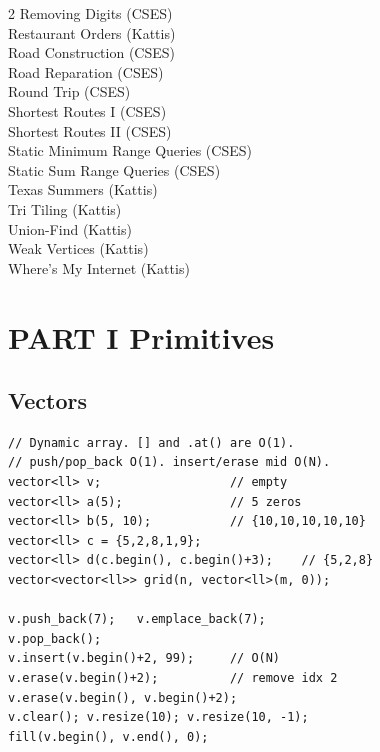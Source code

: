 \documentclass[10pt,letterpaper]{extarticle}
\newenvironment{block}[1]
  {\subsection*{#1}\nopagebreak}
  {\par\addvspace{2pt}}
\begin{document}
\begin{multicols*}{2}
{Removing Digits (CSES)\dotfill \pageref{prob:Removing Digits (CSES)}\\
Restaurant Orders (Kattis)\dotfill \pageref{prob:Restaurant Orders (Kattis)}\\
Road Construction (CSES)\dotfill \pageref{prob:Road Construction (CSES)}\\
Road Reparation (CSES)\dotfill \pageref{prob:Road Reparation (CSES)}\\
Round Trip (CSES)\dotfill \pageref{prob:Round Trip (CSES)}\\
Shortest Routes I (CSES)\dotfill \pageref{prob:Shortest Routes I (CSES)}\\
Shortest Routes II (CSES)\dotfill \pageref{prob:Shortest Routes II (CSES)}\\
Static Minimum Range Queries (CSES)\dotfill \pageref{prob:Static Minimum Range Queries (CSES)}\\
Static Sum Range Queries (CSES)\dotfill \pageref{prob:Static Sum Range Queries (CSES)}\\
Texas Summers (Kattis)\dotfill \pageref{prob:Texas Summers (Kattis)}\\
Tri Tiling (Kattis)\dotfill \pageref{prob:Tri Tiling (Kattis)}\\
Union-Find (Kattis)\dotfill \pageref{prob:Union-Find (Kattis)}\\
Weak Vertices (Kattis)\dotfill \pageref{prob:Weak Vertices (Kattis)}\\
Where's My Internet (Kattis)\dotfill \pageref{prob:Where's My Internet (Kattis)}\\
}

\section*{PART I \textemdash{} Primitives}

\begin{block}{Vectors}
\begin{lstlisting}
// Dynamic array. [] and .at() are O(1).
// push/pop_back O(1). insert/erase mid O(N).
vector<ll> v;                  // empty
vector<ll> a(5);               // 5 zeros
vector<ll> b(5, 10);           // {10,10,10,10,10}
vector<ll> c = {5,2,8,1,9};
vector<ll> d(c.begin(), c.begin()+3);    // {5,2,8}
vector<vector<ll>> grid(n, vector<ll>(m, 0));

v.push_back(7);   v.emplace_back(7);
v.pop_back();
v.insert(v.begin()+2, 99);     // O(N)
v.erase(v.begin()+2);          // remove idx 2
v.erase(v.begin(), v.begin()+2);
v.clear(); v.resize(10); v.resize(10, -1);
fill(v.begin(), v.end(), 0);


\end{lstlisting}
\end{block}
\end{multicols*}
\end{document}
